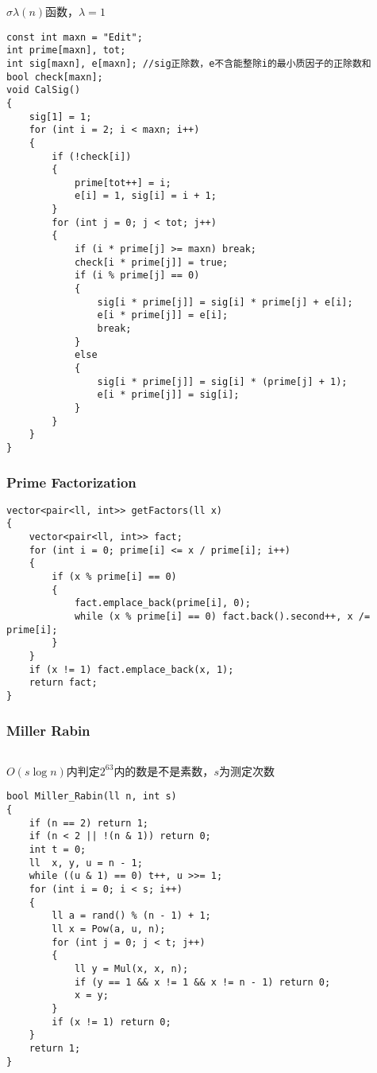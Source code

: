 \documentclass[twoside]{article}
\begin{document}
$\sigma \lambda(n)$函数，$\lambda=1$
\begin{lstlisting}
const int maxn = "Edit";
int prime[maxn], tot;
int sig[maxn], e[maxn]; //sig正除数，e不含能整除i的最小质因子的正除数和
bool check[maxn];
void CalSig()
{
    sig[1] = 1;
    for (int i = 2; i < maxn; i++)
    {
        if (!check[i])
        {
            prime[tot++] = i;
            e[i] = 1, sig[i] = i + 1;
        }
        for (int j = 0; j < tot; j++)
        {
            if (i * prime[j] >= maxn) break;
            check[i * prime[j]] = true;
            if (i % prime[j] == 0)
            {
                sig[i * prime[j]] = sig[i] * prime[j] + e[i];
                e[i * prime[j]] = e[i];
                break;
            }
            else
            {
                sig[i * prime[j]] = sig[i] * (prime[j] + 1);
                e[i * prime[j]] = sig[i];
            }
        }
    }
}\end{lstlisting}
\subsubsection{Prime Factorization}
\begin{lstlisting}
vector<pair<ll, int>> getFactors(ll x)
{
    vector<pair<ll, int>> fact;
    for (int i = 0; prime[i] <= x / prime[i]; i++)
    {
        if (x % prime[i] == 0)
        {
            fact.emplace_back(prime[i], 0);
            while (x % prime[i] == 0) fact.back().second++, x /= prime[i];
        }
    }
    if (x != 1) fact.emplace_back(x, 1);
    return fact;
}\end{lstlisting}
\subsubsection{Miller Rabin}
\begin{lstlisting}
\end{lstlisting}
$O(s\log n)$内判定$2^{63}$内的数是不是素数，$s$为测定次数
\begin{lstlisting}
bool Miller_Rabin(ll n, int s)
{
    if (n == 2) return 1;
    if (n < 2 || !(n & 1)) return 0;
    int t = 0;
    ll  x, y, u = n - 1;
    while ((u & 1) == 0) t++, u >>= 1;
    for (int i = 0; i < s; i++)
    {
        ll a = rand() % (n - 1) + 1;
        ll x = Pow(a, u, n);
        for (int j = 0; j < t; j++)
        {
            ll y = Mul(x, x, n);
            if (y == 1 && x != 1 && x != n - 1) return 0;
            x = y;
        }
        if (x != 1) return 0;
    }
    return 1;
}
\end{lstlisting}
\end{document}
